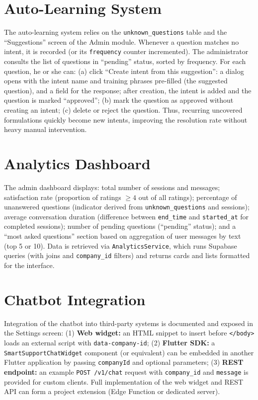 \documentclass[12pt,a4paper]{report}
\begin{document}
\section{Auto-Learning System}

The auto-learning system relies on the \texttt{unknown\_questions} table and the ``Suggestions'' screen of the Admin module. Whenever a question matches no intent, it is recorded (or its \texttt{frequency} counter incremented). The administrator consults the list of questions in ``pending'' status, sorted by frequency. For each question, he or she can: (a) click ``Create intent from this suggestion'': a dialog opens with the intent name and training phrases pre-filled (the suggested question), and a field for the response; after creation, the intent is added and the question is marked ``approved''; (b) mark the question as approved without creating an intent; (c) delete or reject the question. Thus, recurring uncovered formulations quickly become new intents, improving the resolution rate without heavy manual intervention.

\section{Analytics Dashboard}

The admin dashboard displays: total number of sessions and messages; satisfaction rate (proportion of ratings $\geq 4$ out of all ratings); percentage of unanswered questions (indicator derived from \texttt{unknown\_questions} and sessions); average conversation duration (difference between \texttt{end\_time} and \texttt{started\_at} for completed sessions); number of pending questions (``pending'' status); and a ``most asked questions'' section based on aggregation of user messages by text (top 5 or 10). Data is retrieved via \texttt{AnalyticsService}, which runs Supabase queries (with joins and \texttt{company\_id} filters) and returns cards and lists formatted for the interface.

\section{Chatbot Integration}

Integration of the chatbot into third-party systems is documented and exposed in the Settings screen: (1) \textbf{Web widget:} an HTML snippet to insert before \texttt{</body>} loads an external script with \texttt{data-company-id}; (2) \textbf{Flutter SDK:} a \texttt{SmartSupportChatWidget} component (or equivalent) can be embedded in another Flutter application by passing \texttt{companyId} and optional parameters; (3) \textbf{REST endpoint:} an example \texttt{POST /v1/chat} request with \texttt{company\_id} and \texttt{message} is provided for custom clients. Full implementation of the web widget and REST API can form a project extension (Edge Function or dedicated server).
\end{document}
